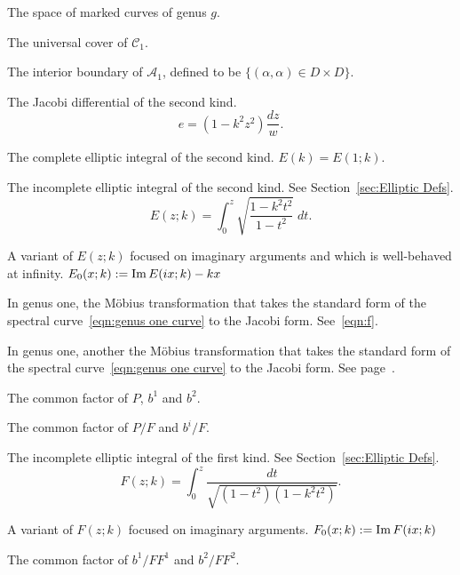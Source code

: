 \begin{description}[align=right]
\item[$\mathcal{C}_g$] The space of marked curves of genus $g$.

\item[$\mathcal{\tilde{C}}_1$] The universal cover of $\mathcal{C}_1$.

\item[$\mathcal{D}$] The interior boundary of $\mathcal{A}_1$, defined to be $\{ (α,α) \in D \times D\}$.

\item[$e$] The Jacobi differential of the second kind.
\[
e = (1-k^2z^2) \frac{dz}{w}.
\]

\item[$E(k)$] The complete elliptic integral of the second kind. $E(k) = E(1;k)$.

\item[$E(z;k)$] The incomplete elliptic integral of the second kind. See Section~\ref{sec:Elliptic Defs}.
\[
E(z;k) = \int_0^z \sqrt{\frac{1-k^2 t^2}{1-t^2}} \;dt.
\]

\item[$E_0(x;k)$] A variant of $E(z;k)$ focused on imaginary arguments and which is well-behaved at infinity. $E_0 (x ; k) := \operatorname{Im} E(i x; k) - kx$

\item[$f(ζ)$] In genus one, the Möbius transformation that takes the standard form of the spectral curve~\eqref{eqn:genus one curve} to the Jacobi form. See~\eqref{eqn:f}.

\item[$f_s(ζ)$] In genus one, another the Möbius transformation that takes the standard form of the spectral curve~\eqref{eqn:genus one curve} to the Jacobi form. See page~\pageref{para:def f_s}.

\item[$F$] The common factor of $P$, $b^1$ and $b^2$.

\item[$F^i$] The common factor of $P/F$ and $b^i/F$.

\item[$F(z;k)$] The incomplete elliptic integral of the first kind. See Section~\ref{sec:Elliptic Defs}.
\[
F(z;k) = \int_0^z \frac{dt}{\sqrt{(1-t^2)(1-k^2 t^2)}}.
\]

\item[$F_0(x;k)$] A variant of $F(z;k)$ focused on imaginary arguments. $F_0 (x ; k) := \operatorname{Im} F(i x; k)$

\item[$G$] The common factor of $b^1/FF^1$ and $b^2/FF^2$.


\end{description}
